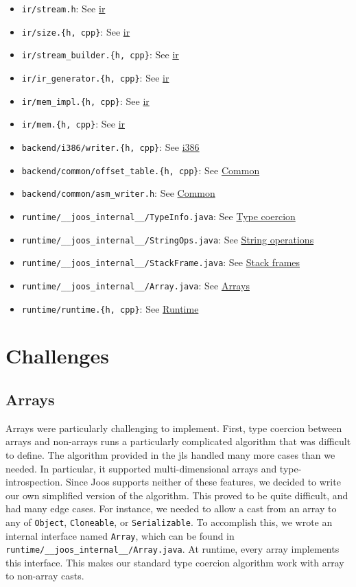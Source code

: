 \documentclass[12pt, titlepage]{article}
\newcommand{\z}[1]{\texttt{#1}}
\begin{document}
\begin{itemize}
  \item \z{ir/stream.h}: See \hyperref[subsec:ir]{\acf{ir}}
  \item \z{ir/size.\{h, cpp\}}: See \hyperref[subsec:ir]{\acf{ir}}
  \item \z{ir/stream\_builder.\{h, cpp\}}: See \hyperref[subsec:ir]{\acf{ir}}
  \item \z{ir/ir\_generator.\{h, cpp\}}: See \hyperref[subsec:ir]{\acf{ir}}
  \item \z{ir/mem\_impl.\{h, cpp\}}: See \hyperref[subsec:ir]{\acf{ir}}
  \item \z{ir/mem.\{h, cpp\}}: See \hyperref[subsec:ir]{\acf{ir}}
  \item \z{backend/i386/writer.\{h, cpp\}}: See \hyperref[subsubsec:i386]{i386}
  \item \z{backend/common/offset\_table.\{h, cpp\}}: See \hyperref[subsubsec:common]{Common}
  \item \z{backend/common/asm\_writer.h}: See \hyperref[subsubsec:common]{Common}
  \item \z{runtime/\_\_joos\_internal\_\_/TypeInfo.java}: See \hyperref[subsubsec:co]{Type coercion}
  \item \z{runtime/\_\_joos\_internal\_\_/StringOps.java}: See \hyperref[subsubsec:strops]{String operations}
  \item \z{runtime/\_\_joos\_internal\_\_/StackFrame.java}: See \hyperref[subsubsec:stacks]{Stack frames}
  \item \z{runtime/\_\_joos\_internal\_\_/Array.java}: See \hyperref[subsec:arrays]{Arrays}
  \item \z{runtime/runtime.\{h, cpp\}}: See \hyperref[subsec:runtime]{Runtime}
\end{itemize}

\section{Challenges}
\subsection{Arrays}\label{subsec:arrays}
Arrays were particularly challenging to implement. First, type coercion between
arrays and non-arrays runs a particularly complicated algorithm that was
difficult to define. The algorithm provided in the \ac{jls} handled many more
cases than we needed. In particular, it supported multi-dimensional arrays and
type-introspection. Since Joos supports neither of these features, we decided
to write our own simplified version of the algorithm. This proved to be quite
difficult, and had many edge cases. For instance, we needed to allow a cast
from an array to any of \z{Object}, \z{Cloneable}, or \z{Serializable}. To
accomplish this, we wrote an internal interface named \z{Array}, which can be
found in \z{runtime/\_\_joos\_internal\_\_/Array.java}. At runtime, every array
implements this interface. This makes our standard type coercion algorithm work
with array to non-array casts.
\end{document}
